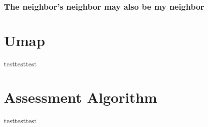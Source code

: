 \subsection{The neighbor’s neighbor may also be my neighbor}

\chapter{Umap}


testtesttest\\

\chapter{Assessment Algorithm}


testtesttest\\